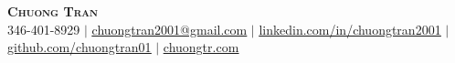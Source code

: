 \begin{center}
	\textbf{\Large \scshape Chuong Tran} \\ \vspace{1pt}
	\footnotesize 346-401-8929 $|$
    \href{mailto:chuongtran2001@gmail.com}{\underline{chuongtran2001@gmail.com}} $|$
	\href{https://www.linkedin.com/in/chuongtran2001/}{\underline{linkedin.com/in/chuongtran2001}} $|$
	\href{https://github.com/chuongtran01}{\underline{github.com/chuongtran01}} $|$
	\href{https://www.chuongtr.com/}{\underline{chuongtr.com}}
\end{center}